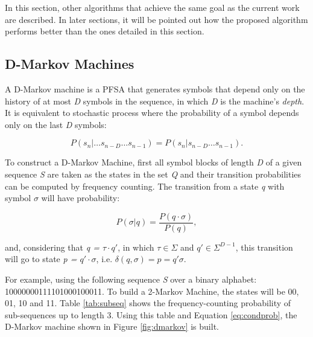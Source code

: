 {In this section, other algorithms that achieve the same goal as the current work are described. In later sections, it will be pointed out how the proposed algorithm performs better than the ones detailed in this section.

\subsection{D-Markov Machines}

A D-Markov machine is a PFSA that generates symbols that depend only on the history of at most \textit{D} symbols in the sequence, in which \textit{D} is the machine's \textit{depth}. It is equivalent to stochastic process where the probability of a symbol depends only on the last \textit{D} symbols:

\[
P(s_n|\ldots s_{n-D}\ldots s_{n-1}) = P(s_n|s_{n-D}\ldots s_{n-1}).
\]

To construct a D-Markov Machine, first all symbol blocks of length \textit{D} of a given sequence \textit{S} are taken as the states in the set \textit{Q} and their transition probabilities can be computed by frequency counting. The transition from a state \textit{q} with symbol $\sigma$ will have probability:

\begin{equation}\label{eq:condprob}
P(\sigma | q) = \frac{P(q\cdot\sigma)}{P(q)},
\end{equation}

\noindent and, considering that \textit{q = \textit{$\tau\cdot q'$}}, in which $\tau\in\Sigma$ and $q'\in\Sigma^{D-1}$, this transition will go to state \textit{p = $q'\cdot\sigma$}, i.e. $\delta(q,\sigma) = p = q'\sigma$.

For example, using the following sequence \textit{S} over a binary alphabet: 10000000111101000100011.
To build a 2-Markov Machine, the states will be 00, 01, 10 and 11. Table \ref{tab:subseq} shows the frequency-counting probability of sub-sequences up to length 3. Using this table and Equation \ref{eq:condprob}, the D-Markov machine shown in Figure \ref{fig:dmarkov} is built.

}
